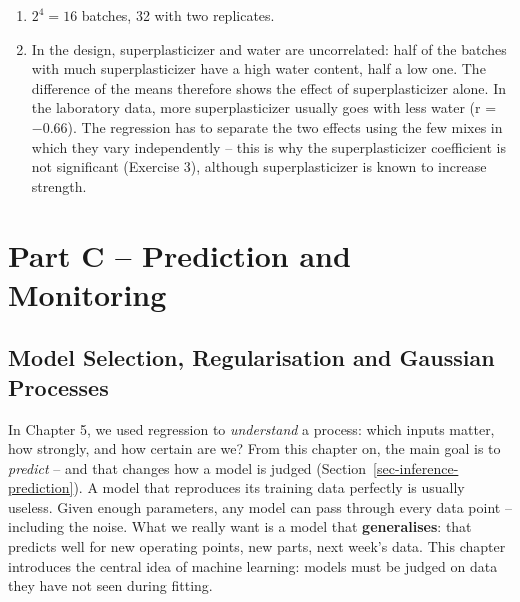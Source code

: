 \documentclass[
  letterpaper,
  DIV=11,
  numbers=noendperiod]{scrreprt}
\begin{document}
\begin{tcolorbox}[enhanced jigsaw, left=2mm, title=\textcolor{quarto-callout-caution-color}{\faFire}\hspace{0.5em}{Solution to Exercise 6}, opacityback=0, breakable, rightrule=.15mm, arc=.35mm, toptitle=1mm, colbacktitle=quarto-callout-caution-color!10!white, opacitybacktitle=0.6, coltitle=black, colframe=quarto-callout-caution-color-frame, bottomrule=.15mm, leftrule=.75mm, bottomtitle=1mm, titlerule=0mm, toprule=.15mm, colback=white]

\begin{enumerate}
\def\labelenumi{(\alph{enumi})}
\item
  \(2^4 = 16\) batches, 32 with two replicates.
\item
  In the design, superplasticizer and water are uncorrelated: half of
  the batches with much superplasticizer have a high water content, half
  a low one. The difference of the means therefore shows the effect of
  superplasticizer alone. In the laboratory data, more superplasticizer
  usually goes with less water (r = −0.66). The regression has to
  separate the two effects using the few mixes in which they vary
  independently -- this is why the superplasticizer coefficient is not
  significant (Exercise 3), although superplasticizer is known to
  increase strength.
\end{enumerate}

\end{tcolorbox}

\part{Part C -- Prediction and Monitoring}

\chapter{Model Selection, Regularisation and Gaussian
Processes}\label{model-selection-regularisation-and-gaussian-processes}

In Chapter 5, we used regression to \emph{understand} a process: which
inputs matter, how strongly, and how certain are we? From this chapter
on, the main goal is to \emph{predict} -- and that changes how a model
is judged (Section~\ref{sec-inference-prediction}). A model that
reproduces its training data perfectly is usually useless. Given enough
parameters, any model can pass through every data point -- including the
noise. What we really want is a model that \textbf{generalises}: that
predicts well for new operating points, new parts, next week's data.
This chapter introduces the central idea of machine learning: models
must be judged on data they have not seen during fitting.
\end{document}

